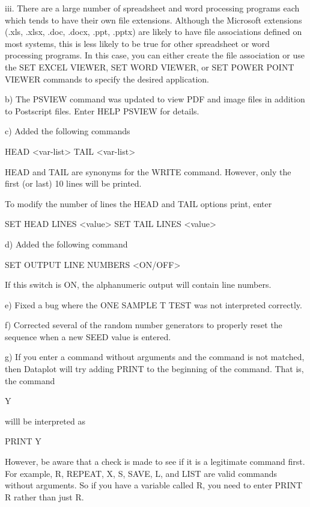          iii. There are a large number of spreadsheet and word
              processing programs each which tends to have their
              own file extensions.  Although the Microsoft extensions
              (.xls, .xlsx, .doc, .docx, .ppt, .pptx) are likely to
              have file associations defined on most systems, this is
              less likely to be true for other spreadsheet or word
              processing programs.  In this case, you can either
              create the file association or use the SET EXCEL VIEWER,
              SET WORD VIEWER, or SET POWER POINT VIEWER commands to
              specify the desired application.

    b) The PSVIEW command was updated to view PDF and image files
       in addition to Postscript files.  Enter HELP PSVIEW for
       details.

    c) Added the following commands

          HEAD <var-list>
          TAIL <var-list>

       HEAD and TAIL are synonyms for the WRITE command.  However, only
       the first (or last) 10 lines will be printed.

       To modify the number of lines the HEAD and TAIL options print,
       enter

          SET HEAD LINES <value>
          SET TAIL LINES <value>

    d) Added the following command

          SET OUTPUT LINE NUMBERS <ON/OFF>

       If this switch is ON, the alphanumeric output will
       contain line numbers.

    e) Fixed a bug where the ONE SAMPLE T TEST was not
       interpreted correctly.

    f) Corrected several of the random number generators to
       properly reset the sequence when a new SEED value is
       entered.

    g) If you enter a command without arguments and the command
       is not matched, then Dataplot will try adding  PRINT to the
       beginning of the command.  That is, the command

           Y

       willl be interpreted as 

           PRINT Y

       However, be aware that a check is made to see if it is
       a legitimate command first.  For example, R, REPEAT, X,
       S, SAVE, L, and LIST are valid commands without arguments.
       So if you have a variable called R, you need to enter
       PRINT R rather than just R.

